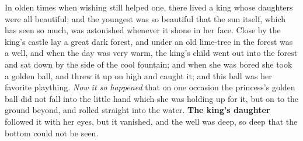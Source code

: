 In olden times when wishing still helped one, there lived a king whose daughters were all
beautiful; and the youngest was so beautiful that the sun itself, which has seen so much, was
astonished whenever it shone in her face. Close by the king's castle lay a great dark forest,
and under an old lime-tree in the forest was a well, and when the day was very warm, the
king's child went out into the forest and sat down by the side of the cool fountain; and when
she was bored she took a golden ball, and threw it up on high and caught it; and this ball was
her favorite plaything. \emph{Now it so happened} that on one occasion the princess's golden
ball did not fall into the little hand which she was holding up for it, but on to the ground
beyond, and rolled straight into the water. \textbf{The king's daughter} followed it with her
eyes, but it vanished, and the well was deep, so deep that the bottom could not be seen.
